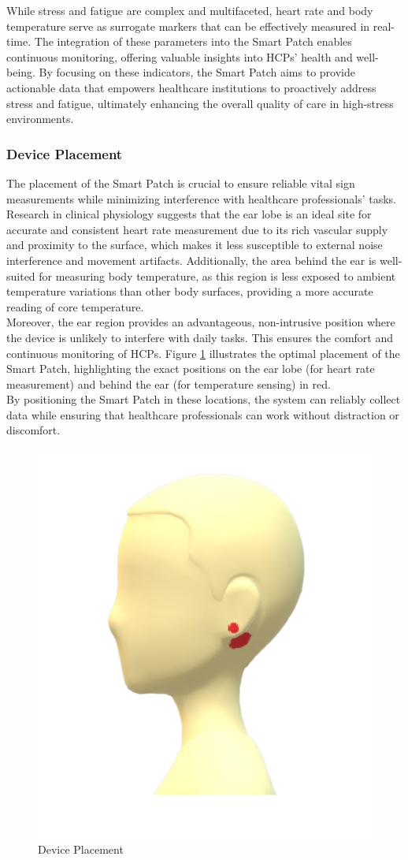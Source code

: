  \noindent While stress and fatigue are complex and multifaceted, heart rate and body temperature serve as surrogate markers that can be effectively measured in real-time. The integration of these parameters into the Smart Patch enables continuous monitoring, offering valuable insights into HCPs’ health and well-being. By focusing on these indicators, the Smart Patch aims to provide actionable data that empowers healthcare institutions to proactively address stress and fatigue, ultimately enhancing the overall quality of care in high-stress environments.
 
 \subsubsection{Device Placement}
The placement of the Smart Patch is crucial to ensure reliable vital sign measurements while minimizing interference with healthcare professionals' tasks. Research in clinical physiology suggests that the ear lobe is an ideal site for accurate and consistent heart rate measurement due to its rich vascular supply and proximity to the surface, which makes it less susceptible to external noise interference and movement artifacts. Additionally, the area behind the ear is well-suited for measuring body temperature, as this region is less exposed to ambient temperature variations than other body surfaces, providing a more accurate reading of core temperature.\\

\noindent Moreover, the ear region provides an advantageous, non-intrusive position where the device is unlikely to interfere with daily tasks. This ensures the comfort and continuous monitoring of HCPs. Figure \ref{fig:device-placement} illustrates the optimal placement of the Smart Patch, highlighting the exact positions on the ear lobe (for heart rate measurement) and behind the ear (for temperature sensing) in red.\\

\noindent By positioning the Smart Patch in these locations, the system can reliably collect data while ensuring that healthcare professionals can work without distraction or discomfort.

 \begin{figure}[h!]
     \centering
     \includegraphics[width=0.3\linewidth]{images/device-placement.png}
     \caption{Device Placement}
     \label{fig:device-placement}
 \end{figure}

